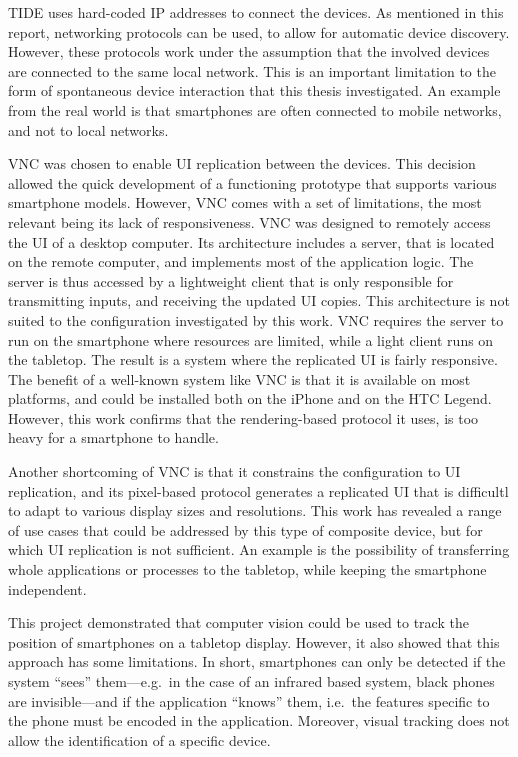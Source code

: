 TIDE uses hard-coded IP addresses to connect the devices.
As mentioned in this report, networking protocols can be used, to allow for automatic device discovery.
However, these protocols work under the assumption that the involved devices are connected to the same local network.
This is an important limitation to the form of spontaneous device interaction that this thesis investigated.
An example from the real world is that smartphones are often connected to mobile networks, and not to local networks.

VNC \citep{Richardson:1998:vnc} was chosen to enable UI replication between the devices.
This decision allowed the quick development of a functioning prototype that supports various smartphone models.
However, VNC comes with a set of limitations, the most relevant being its lack of responsiveness.
VNC was designed to remotely access the UI of a desktop computer.
Its architecture includes a server, that is located on the remote computer, and implements most of the application logic.
The server is thus accessed by a lightweight client that is only responsible for transmitting inputs, and receiving the updated UI copies.
This architecture is not suited to the configuration investigated by this work.
VNC requires the server to run on the smartphone where resources are limited, while a light client runs on the tabletop.
The result is a system where the replicated UI is fairly responsive.
The benefit of a well-known system like VNC is that it is available on most platforms, and could be installed both on the iPhone and on the HTC Legend.
However, this work confirms that the rendering-based protocol it uses, is too heavy for a smartphone to handle.

Another shortcoming of VNC is that it constrains the configuration to UI replication, and its pixel-based protocol generates a replicated UI that is difficultl to adapt to various display sizes and resolutions.
This work has revealed a range of use cases that could be addressed by this type of composite device, but for which UI replication is not sufficient.
An example is the possibility of transferring whole applications or processes to the tabletop, while keeping the smartphone independent.

This project demonstrated that computer vision could be used to track the position of smartphones on a tabletop display.
However, it also showed that this approach has some limitations.
In short, smartphones can only be detected if the system ``sees'' them---e.g.\ in the case of an infrared based system, black phones are invisible---and if the application ``knows'' them, i.e.\ the features specific to the phone must be encoded in the application.
Moreover, visual tracking does not allow the identification of a specific device.



